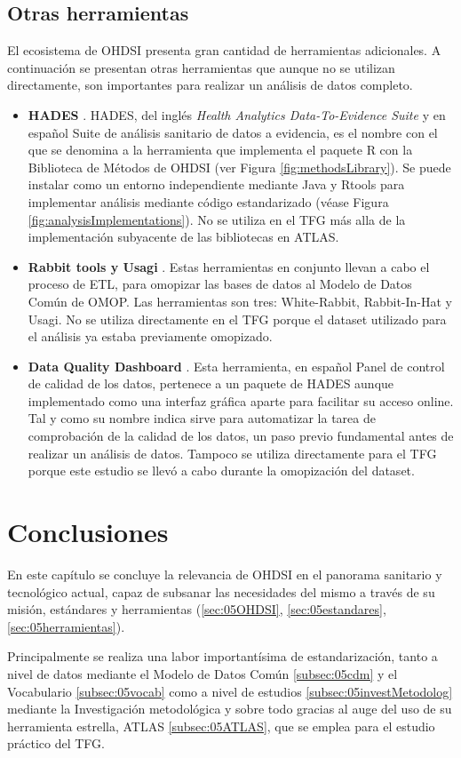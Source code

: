 \subsection{Otras herramientas} \label{subsec:05otrasHerramientas}

El ecosistema de OHDSI presenta gran cantidad de herramientas adicionales. A continuación se presentan otras herramientas que aunque no se utilizan directamente, son importantes para realizar un análisis de datos completo. 

\begin{itemize}
    
    \item \textbf{HADES} \cite{githubHADES}. HADES, del inglés\textit{ Health Analytics Data-To-Evidence Suite} y en español Suite de análisis sanitario de datos a evidencia, es el nombre con el que se denomina a la herramienta que implementa el paquete R con la Biblioteca de Métodos de OHDSI (ver Figura \ref{fig:methodsLibrary}). Se puede instalar como un entorno independiente mediante Java y Rtools para implementar análisis mediante código estandarizado (véase Figura \ref{fig:analysisImplementations}). No se utiliza en el TFG más alla de la implementación subyacente de las bibliotecas en ATLAS.
    \item \textbf{Rabbit tools y Usagi} \cite{OHDSIsoftTools}. Estas herramientas en conjunto llevan a cabo el proceso de ETL, para omopizar las bases de datos al Modelo de Datos Común de OMOP. Las herramientas son tres: White-Rabbit, Rabbit-In-Hat y Usagi. No se utiliza directamente en el TFG porque el dataset utilizado para el análisis ya estaba previamente omopizado.
    \item \textbf{Data Quality Dashboard} \cite{githubDQD}. Esta herramienta, en español Panel de control de calidad de los datos, pertenece a un paquete de HADES aunque implementado como una interfaz gráfica aparte para facilitar su acceso online. Tal y como su nombre indica sirve para automatizar la tarea de comprobación de la calidad de los datos, un paso previo fundamental antes de realizar un análisis de datos. Tampoco se utiliza directamente para el TFG porque este estudio se llevó a cabo durante la omopización del dataset.
        
\end{itemize}

\section{Conclusiones} \label{sec:05conclusion}

En este capítulo se concluye la relevancia de OHDSI en el panorama sanitario y tecnológico actual, capaz de subsanar las necesidades del mismo a través de su misión, estándares y herramientas (\ref{sec:05OHDSI}, \ref{sec:05estandares}, \ref{sec:05herramientas}).

Principalmente se realiza una labor importantísima de estandarización, tanto a nivel de datos mediante el Modelo de Datos Común \ref{subsec:05cdm} y el Vocabulario \ref{subsec:05vocab} como a nivel de estudios \ref{subsec:05investMetodolog} mediante la Investigación metodológica y sobre todo gracias al auge del uso de su herramienta estrella, ATLAS \ref{subsec:05ATLAS}, que se emplea para el estudio práctico del TFG.